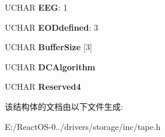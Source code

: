 \begin{DoxyCompactItemize}
\mbox{\label{struct___m_o_d_e___d_e_v_i_c_e___c_o_n_f_i_g_u_r_a_t_i_o_n___p_a_g_e_aafaa38330ca905121458f0147faa9f0b}} 
U\+C\+H\+AR {\bfseries E\+EG}\+: 1
\item 
\mbox{\label{struct___m_o_d_e___d_e_v_i_c_e___c_o_n_f_i_g_u_r_a_t_i_o_n___p_a_g_e_a9377fa8441267dab289a764b97607b67}} 
U\+C\+H\+AR {\bfseries E\+O\+Ddefined}\+: 3
\item 
\mbox{\label{struct___m_o_d_e___d_e_v_i_c_e___c_o_n_f_i_g_u_r_a_t_i_o_n___p_a_g_e_af8d85a9f8d3415cc96061e3927d86244}} 
U\+C\+H\+AR {\bfseries Buffer\+Size} \mbox{[}3\mbox{]}
\item 
\mbox{\label{struct___m_o_d_e___d_e_v_i_c_e___c_o_n_f_i_g_u_r_a_t_i_o_n___p_a_g_e_affa6d2209480cfffef699b45ff4b561f}} 
U\+C\+H\+AR {\bfseries D\+C\+Algorithm}
\item 
\mbox{\label{struct___m_o_d_e___d_e_v_i_c_e___c_o_n_f_i_g_u_r_a_t_i_o_n___p_a_g_e_ae9b1ba77084db206a0f949321e88deaf}} 
U\+C\+H\+AR {\bfseries Reserved4}
\end{DoxyCompactItemize}


该结构体的文档由以下文件生成\+:\begin{DoxyCompactItemize}
\item 
E\+:/\+React\+O\+S-\/0../drivers/storage/inc/tape.\+h\end{DoxyCompactItemize}
